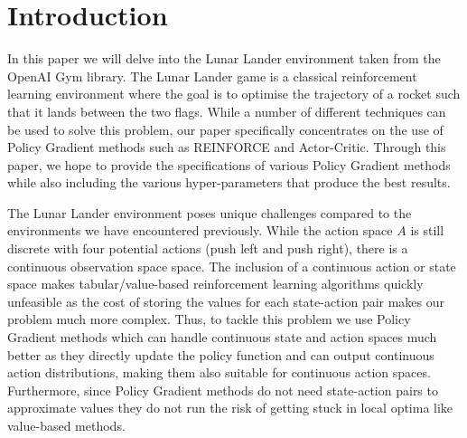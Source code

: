 \documentclass{article}
\begin{document}

\begin{abstract}

\end{abstract}

\section {Introduction}
In this paper we will delve into the Lunar Lander environment taken from the OpenAI Gym library. The Lunar Lander game is a classical reinforcement learning environment where the goal is to optimise the trajectory of a rocket such that it lands between the two flags.
 While a number of different techniques can be used to solve this problem, our paper specifically concentrates on the use of Policy Gradient methods such as REINFORCE and Actor-Critic. Through this paper, we hope to provide the specifications of various Policy Gradient methods while also including the various hyper-parameters that produce the best results.%



The Lunar Lander environment poses unique challenges compared to the environments we have encountered previously. While the action space $A$ is still discrete with four potential actions (push left and push right), there is a continuous observation space space. The inclusion of a continuous action or state space makes tabular/value-based reinforcement learning algorithms quickly unfeasible as the cost of storing the values for each state-action pair makes our problem much more complex. 
Thus, to tackle this problem we use Policy Gradient methods which can handle continuous state and action spaces much better as they directly update the policy function and can output continuous action distributions, making them also suitable for continuous action spaces. Furthermore, since Policy Gradient methods do not need state-action pairs to approximate values they do not run the risk of getting stuck in local optima like value-based methods.
\end{document}
